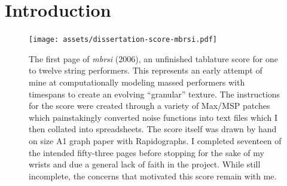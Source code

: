 \chapter{Introduction}
\label{chap:introduction}

\begin{figure}
\begin{centering}
\texttt{[image: assets/dissertation-score-mbrsi.pdf]}
\caption{The first page of \emph{mbrsi} (2006), an unfinished tablature score
for one to twelve string performers. This represents an early attempt of mine
at computationally modeling massed performers with timespans to create an
evolving \enquote{granular} texture. The instructions for the score were
created through a variety of Max/MSP patches which painstakingly converted
noise functions into text files which I then collated into spreadsheets. The
score itself was drawn by hand on size A1 graph paper with Rapidographs.
I completed seventeen of the intended fifty-three pages before stopping for the
sake of my wrists and due a general lack of faith in the project. While still
incomplete, the concerns that motivated this score remain with me.}
\end{centering} \end{figure}

\begin{figure}
\end{figure}

